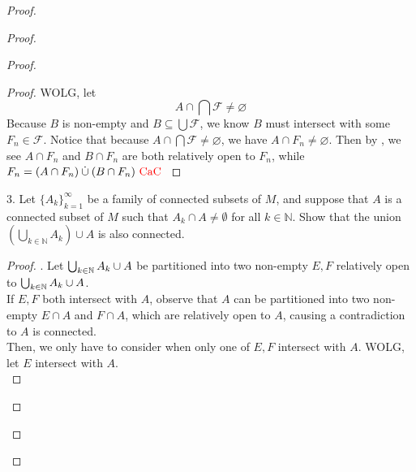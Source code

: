 \documentclass{report}
\begin{document}
\begin{proof}
\begin{proof}
\begin{proof}
\begin{proof}
WOLG, let
\begin{equation}
A\cap \bigcap \mathcal{F}\neq \varnothing
\end{equation}
Because $B$ is non-empty and $B\subseteq \bigcup \mathcal{F}$, we know $B$ must intersect with some $F_n\in \mathcal{F}$. Notice that because $A\cap \bigcap \mathcal{F}\neq \varnothing$, we have $A\cap F_n\neq \varnothing$. Then by , we see $A\cap F_n$ and $B\cap F_n$ are both relatively open to $F_n$, while $F_n= (A\cap F_n)\mathbin{\dot{\cup}} (B\cap F_n)\text{ \textcolor{red}{CaC} }$ 
\end{proof}
\begin{question}{}{}
3. Let $\{A_k\}_{k=1}^{\infty}$ be a family of connected subsets of $M$, and suppose that $A$ is a connected subset of $M$ such that $A_k \cap A \neq \emptyset$ for all $k \in \mathbb{N}$. Show that the union $\left(\bigcup_{k \in \mathbb{N}} A_k\right) \cup A$ is also connected.
\end{question}
\begin{proof}
. Let $\bigcup_{k\in\mathbb{N}}A_k\cup A$ be partitioned into two non-empty  $E,F$ relatively open to  $\bigcup_{k\in\mathbb{N}}A_k\cup A$.\\

If $E,F$ both intersect with  $A$, observe that $A$ can be partitioned into two non-empty $E\cap A$ and $F\cap A$, which are relatively open to $A$, causing a contradiction to  $A$ is connected.\\

Then, we only have to consider when only one of  $E,F$ intersect with  $A$. WOLG, let  $E$ intersect with $A$.\\


\end{proof}
\end{proof}
\end{proof}
\end{proof}
\end{document}
